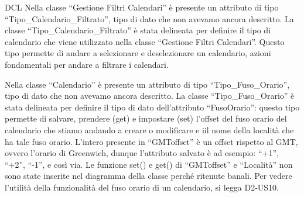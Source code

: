 \begin{listaPersonale}{DCL}
    Nella classe “Gestione Filtri Calendari” è presente un attributo di tipo “Tipo\_Calendario\_Filtrato”, tipo di dato che non avevamo ancora descritto. La classe “Tipo\_Calendario\_Filtrato” è stata delineata per definire il tipo di calendario che viene utilizzato nella classe “Gestione Filtri Calendari”. Questo tipo permette di andare a selezionare e deselezionare un calendario, azioni fondamentali per andare a filtrare i calendari.
    \begin{comment}
        \begin{center}
            \\
            \blfootnote{Immagine \href{https://github.com/Life-planner/Documentazione/blob/main/D3/img/Diagrammi/png/path/to/img.png}{PNG}/\href{https://github.com/Life-planner/Documentazione/blob/main/D3/img/Diagrammi/svg/path/to/img.svg}{SVG} nome file}
        \end{center}
    \end{comment}




    Nella classe “Calendario” è presente un attributo di tipo “Tipo\_Fuso\_Orario”, tipo di dato che non avevamo ancora descritto. La classe “Tipo\_Fuso\_Orario” è stata delineata per definire il tipo di dato dell'attributo “FusoOrario”: questo tipo permette di salvare, prendere (get) e impostare (set) l'offset del fuso orario del calendario che stiamo andando a creare o modificare e iil nome della località che ha tale fuso orario. L'intero presente in “GMToffset” è un offset rispetto al GMT, ovvero l'orario di Greenwich, dunque l'attributo salvato è ad esempio: “+1”, “+2”, “-1”, e così via. Le funzione set() e get() di “GMToffset” e “Località” non sono state inserite nel diagramma della classe perché ritenute banali. Per vedere l'utilità della funzionalità del fuso orario di un calendario, si legga D2-US10.
    \begin{comment}
        \begin{center}
            \\
            \blfootnote{Immagine \href{https://github.com/Life-planner/Documentazione/blob/main/D3/img/Diagrammi/png/path/to/img.png}{PNG}/\href{https://github.com/Life-planner/Documentazione/blob/main/D3/img/Diagrammi/svg/path/to/img.svg}{SVG} nome file}
        \end{center}
    \end{comment}



\end{listaPersonale}
